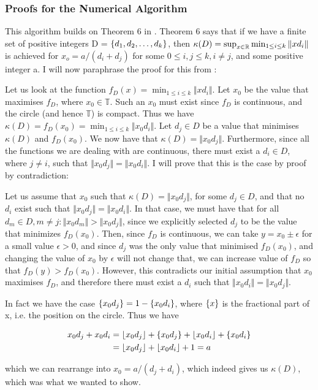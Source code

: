 \subsubsection{Proofs for the Numerical Algorithm}
\label{proof_num}
\begin{theo}[Correctness:]
This algorithm builds on Theorem 6 in \cite{invis}. Theorem 6 says that if we have a finite set of positive integers D = $\{d_1, d_2, \ldots, d_k\}$, then  $\kappa(D) = \sup_{x \in \mathbb{R}}\min_{1\leq i \leq k}\Vert x d_i \Vert$ is achieved for $x_o = a/(d_i + d_j)$ for some $0 \leq i,j \leq k, i \neq j$, and some positive integer a. I will now paraphrase the proof for this from \cite{invis}:

Let us look at the function $f_D(x) = \min_{1 \leq i \leq k}\Vert x d_i \Vert$. Let $x_0$ be the value that maximises $f_D$, where $x_0 \in \mathbb{T}$. Such an $x_0$ must exist since $f_D$ is continuous, and the circle (and hence $\mathbb{T}$) is compact. Thus we have $\kappa(D) = f_D(x_0) = \min_{1 \leq i \leq k} \Vert x_0 d_i \Vert$. Let $d_j \in D$ be a value that minimises $\kappa(D)$ and $f_D(x_0)$. We now have that $\kappa(D) = \Vert x_0 d_j\Vert$. 
Furthermore, since all the functions we are dealing with are continuous, there must exist a $d_i \in D$, where $j \neq i$, such that $\Vert x_0 d_j \Vert = \Vert x_0 d_i \Vert$. I will prove that this is the case by proof by contradiction:

Let us assume that $x_0$ such that $\kappa(D) = \Vert x_0 d_j \Vert$, for some $d_j \in D$, and that no $d_i$ exist such that $\Vert x_0 d_j \Vert = \Vert x_0 d_i\Vert$. In that case, we must have that for all $d_m \in D, m \neq j: \Vert x_0 d_m \Vert > \Vert x_0 d_j\Vert$, since we explicitly selected $d_j$ to be the value that minimizes $f_D(x_0)$. Then, since $f_D$ is continuous, we can take $y = x_0 \pm \epsilon$ for a small value $\epsilon > 0$, and since $d_j$ was the only value that minimised $f_D(x_0)$, and changing the value of $x_0$ by $\epsilon$ will not change that, we can increase value of $f_D$ so that $f_D(y) > f_D(x_0)$. However, this contradicts our initial assumption that $x_0$ maximises $f_D$, and therefore there must exist a $d_i$ such that $\Vert x_0 d_i \Vert = \Vert x_0 d_j \Vert$.  
 
In fact we have the case $\{x_0 d_j\} = 1 - \{x_0 d_i\}$, where $\{x\}$ is the fractional part of x, i.e. the position on the circle. Thus we have 

\begin{equation}
\begin{split}
x_0d_j + x_0d_i &= \lfloor x_0d_j \rfloor + \{x_0d_j\} + \lfloor x_0d_i \rfloor + \{x_0d_i\} \\
               &= \lfloor x_0d_j \rfloor + \lfloor x_0d_i \rfloor + 1 = a
\end{split} 
\end{equation}

which we can rearrange into $x_0 = a / (d_j + d_i)$, which indeed gives us $\kappa(D)$, which was what we wanted to show.
\end{theo}

